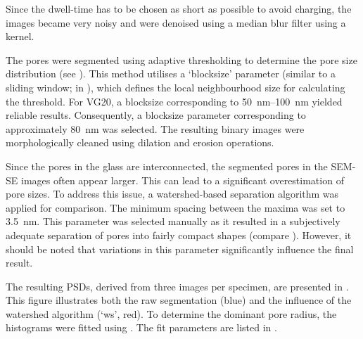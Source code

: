 Since the dwell-time has to be chosen as short as possible to avoid charging, the images became very noisy and were denoised using a median blur filter using a  kernel.

The pores were segmented using adaptive thresholding to determine the pore size distribution (see ).
This method utilises a `blocksize' parameter (similar to a sliding window; in \unit{\px}), which defines the local neighbourhood size for calculating the threshold.
For \acs{VG20}, a blocksize corresponding to \qtyrange{50}{100}{\nano\meter} yielded reliable results.
Consequently, a blocksize parameter corresponding to approximately \qty{80}{\nano\meter} was selected.
The resulting binary images were morphologically cleaned using dilation and erosion operations.

Since the pores in the glass are interconnected, the segmented pores in the \ac{SEM}-\ac{SE} images often appear larger.
This can lead to a significant overestimation of pore sizes.
To address this issue, a watershed-based separation algorithm was applied for comparison.
The minimum spacing between the maxima was set to \qty{3.5}{\nano\meter}.
This parameter was selected manually as it resulted in a subjectively adequate separation of pores into fairly compact shapes (compare ).
However, it should be noted that variations in this parameter significantly influence the final result.

The resulting \ac{PSD}s, derived from three images per specimen, are presented in .
This figure illustrates both the raw segmentation (blue) and the influence of the watershed algorithm (`ws', red).
To determine the dominant pore radius, the histograms were fitted using .
The fit parameters are listed in .


